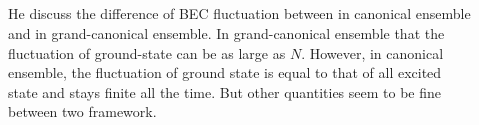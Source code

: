 \subsection{}
\begin{description}
\item[\cite{Politzer}]He discuss the difference of BEC fluctuation between in canonical ensemble and in grand-canonical ensemble.  In grand-canonical ensemble that the fluctuation of ground-state can be as large as $N$.  However, in canonical ensemble, the fluctuation of ground state is equal to that of all excited state and stays finite all the time.  But other quantities seem to be fine between two framework.  
\end{description}
